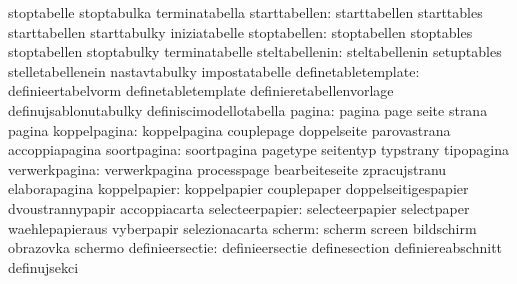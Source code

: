                                   stoptabelle                      stoptabulka
                                  terminatabella
                   starttabellen: starttabellen                    starttables
                                  starttabellen                    starttabulky
                                  iniziatabelle
                    stoptabellen: stoptabellen                     stoptables
                                  stoptabellen                     stoptabulky
                                  terminatabelle
                  steltabellenin: steltabellenin                   setuptables
                                  stelletabellenein                nastavtabulky
                                  impostatabelle
             definetabletemplate: definieertabelvorm               definetabletemplate
                                  definieretabellenvorlage         definujsablonutabulky
                                  definiscimodellotabella
                          pagina: pagina                           page
                                  seite                            strana
                                  pagina
                    koppelpagina: koppelpagina                     couplepage
                                  doppelseite                      parovastrana
                                  accoppiapagina                   %
                     soortpagina: soortpagina                      pagetype
                                  seitentyp                        typstrany
                                  tipopagina
                   verwerkpagina: verwerkpagina                    processpage
                                  bearbeiteseite                   zpracujstranu
                                  elaborapagina
                    koppelpapier: koppelpapier                     couplepaper
                                  doppelseitigespapier             dvoustrannypapir
                                  accoppiacarta                    %
                 selecteerpapier: selecteerpapier                  selectpaper
                                  waehlepapieraus                  vyberpapir
                                  selezionacarta
                          scherm: scherm                           screen
                                  bildschirm                       obrazovka
                                  schermo
                 definieersectie: definieersectie                  definesection
                                  definiereabschnitt               definujsekci
